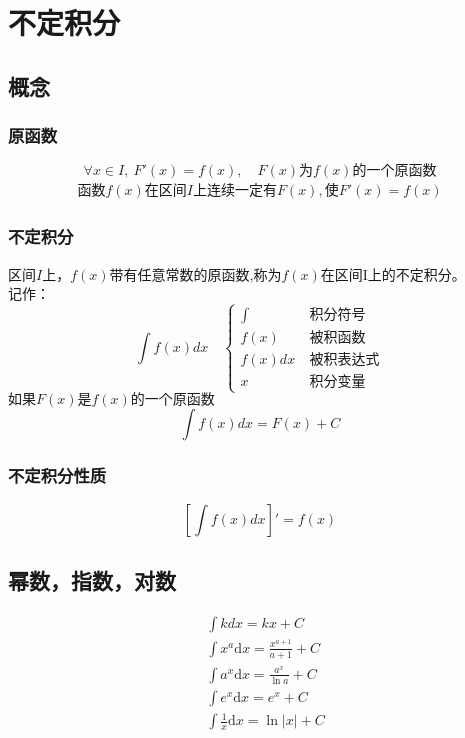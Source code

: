 \section{不定积分}
\subsection{概念}
\subsubsection{原函数}
$$\forall x\in I,\ F'(x)=f(x),\quad F(x)\mbox{为}f(x)\mbox{的一个原函数}$$
\begin{align}
    \mbox{函数}f(x)\mbox{在区间}I\mbox{上连续一定有}F(x),\mbox{使}F'(x)=f(x)
\end{align}
\subsubsection{不定积分}
区间$I$上，$f(x)$带有任意常数的原函数,称为$f(x)$在区间I上的不定积分。\\
记作：
$$\int f(x)dx\quad\begin{cases}
    \int&\mbox{积分符号}\\
    f(x)&\mbox{被积函数}\\
    f(x)dx\ &\mbox{被积表达式}\\
    x &\mbox{积分变量}
\end{cases}$$
$\mbox{如果}F(x)\mbox{是}f(x)\mbox{的一个原函数}$
$$\int f(x)dx=F(x)+C$$
\subsubsection{不定积分性质}
$$\left[\int f(x)dx\right]'=f(x)$$
\subsection{幂数，指数，对数}
\begin{align}
&\int k dx=kx +C\\
&\int x^a \mathrm{d}{x} = \frac{x^{a+1}}{a+1} + C\\
&\int a^x \mathrm{d}{x} = \frac{a^x}{\ln a} + C\\
&\int e^x \mathrm{d}{x} = e^x + C\\
&\int \frac{1}{x} \mathrm{d}{x} = \ln\left|x\right| + C
\end{align}
